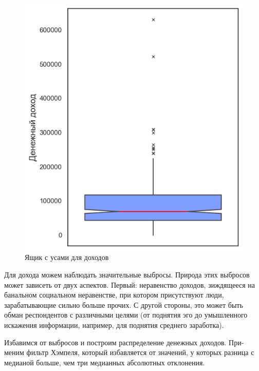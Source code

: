 \documentclass[12pt]{report}
\begin{document}
    {\begin{figure}
      \vspace*{-0.5cm}
      \begin{flushright}
        \hspace*{-0.5cm} \includegraphics[scale=0.45]{title/income_with_bad_values.png}  
        \caption{Ящик с усами для доходов}      
      \end{flushright}
    \end{figure}
    \par
    Для дохода можем наблюдать значительные выбросы. Природа этих выбросов может зависеть от двух аспектов. Первый: неравенство доходов, зиждящееся на банальном социальном неравенстве, при котором присутствуют люди, зарабатывающие сильно больше прочих. С другой стороны, это может быть обман  респондентов с различными целями (от поднятия эго до умышленного искажения информации, например, для поднятия среднего заработка). 
    \par
    Избавимся от выбросов и построим распределение денежных доходов. При-\\меним фильтр Хэмпеля, который избавляется от значений, у которых разница с \\медианой больше, чем три медианных абсолютных отклонения.}
\end{document}
